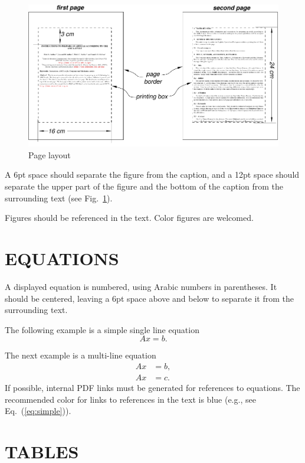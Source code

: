 \documentclass[oneside,a4paper,english,links]{amca}
\begin{document}
\begin{figure}[htb]
\centerline{\includegraphics{firstpage}}
\caption{Page layout}
\label{fg:figure}
\end{figure}

A 6pt space should separate the figure from the caption, and a
12pt space should separate the upper part of the figure and the
bottom of the caption from the surrounding text (see
Fig.~\ref{fg:figure}).

Figures should be referenced in the text. Color figures are welcomed.

\section{EQUATIONS}

A displayed equation is numbered, using Arabic numbers in parentheses.
It should be  centered, leaving a 6pt space above and below to separate it from
the surrounding text.

The following example is a simple single line
equation
%
\begin{equation}
Ax = b.
\end{equation}

The next example is a multi-line equation
%
\begin{equation} \label{eq:simple}  
\begin{aligned}
Ax& = b,\\
Ax& = c.
\end{aligned}
\end{equation}
%
If possible, internal PDF links must be generated for references to
equations. The recommended color for links to references in the text
is blue (e.g., see Eq.~(\ref{eq:simple})).

\section{TABLES}
\end{document}
